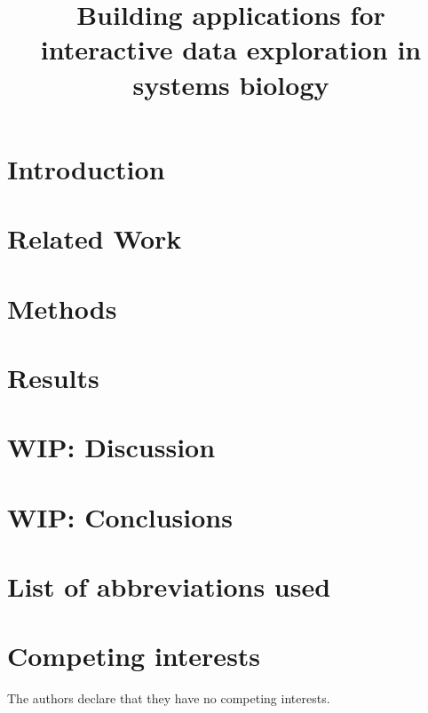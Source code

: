 \documentclass[sigconf]{acmart}
\begin{document}
\title{Building applications for interactive data exploration in systems biology}

 
 

\maketitle

\section*{Introduction}
 
\section*{Related Work}
 
\section*{Methods} 
 
\section*{Results}
 
\section*{WIP: Discussion} 
 
\section*{WIP: Conclusions}
 

\section*{List of abbreviations used}
\section*{Competing interests}
The authors declare that they have no competing interests.
\end{document}
